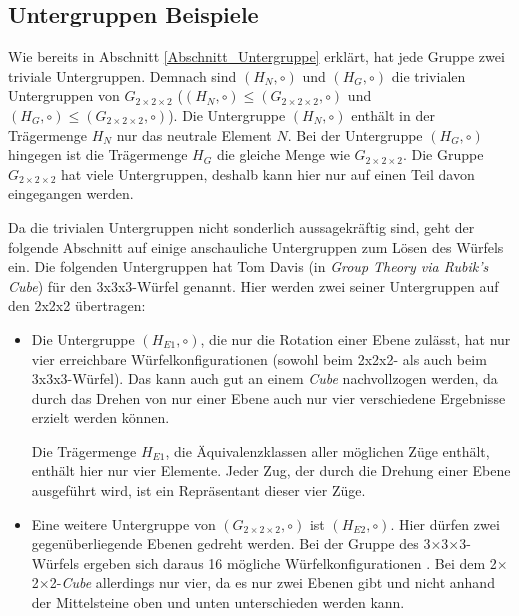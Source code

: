 \documentclass[12pt,a4paper, usenames, dvipsnames]{article}
\theoremstyle{mystyle}
\theoremstyle{definition}
\newcommand{\Gtwo}{\ensuremath{G_{2\times 2\times 2}}}
\newcommand{\Ttwo}{2$\times$2$\times$2-}
\newcommand{\Tthree}{3$\times$3$\times$3-}
\begin{document}
%
%
%
%
%
%
%
%
%
%
%
%
%
%
%
%
%
%
%
%
\subsection{Untergruppen Beispiele}



Wie bereits in Abschnitt \ref{Abschnitt_Untergruppe} erklärt, hat jede Gruppe zwei triviale Untergruppen. Demnach sind $(H_N, \circ)$ und $(H_G, \circ)$ die trivialen Untergruppen von $\Gtwo$ ($(H_N, \circ) \leqslant (\Gtwo, \circ)$ und $(H_G, \circ) \leqslant (\Gtwo, \circ)$). Die Untergruppe $(H_N, \circ)$ enthält in der Trägermenge $H_N$ nur das neutrale Element $N$. Bei der Untergruppe $(H_G, \circ)$ hingegen ist die Trägermenge $H_G$ die gleiche Menge wie $\Gtwo$.
Die Gruppe $\Gtwo$ hat viele Untergruppen, deshalb kann hier nur auf einen Teil davon eingegangen werden. 


Da die trivialen Untergruppen nicht sonderlich aussagekräftig sind, geht der folgende Abschnitt auf einige anschauliche Untergruppen zum Lösen des Würfels ein. Die folgenden Untergruppen hat Tom Davis (in  \textit{Group Theory via Rubik's Cube}) \cite{TD} für den 3x3x3-Würfel genannt. Hier werden zwei seiner Untergruppen auf den 2x2x2 übertragen: 
\begin{itemize}
\item Die Untergruppe $(H_{E1}, \circ)$, die nur die Rotation einer Ebene zulässt, hat nur vier erreichbare Würfelkonfigurationen (sowohl beim 2x2x2- als auch beim 3x3x3-Würfel). Das kann auch gut an einem \textit{Cube} nachvollzogen werden, da durch das Drehen von nur einer Ebene auch nur vier verschiedene Ergebnisse erzielt werden können.

Die Trägermenge $H_{E1}$, die Äquivalenzklassen aller möglichen Züge enthält, enthält hier nur vier Elemente. Jeder Zug, der durch die Drehung einer Ebene ausgeführt wird, ist ein Repräsentant dieser vier Züge.

\item Eine weitere Untergruppe von $(\Gtwo, \circ)$ ist $(H_{E2}, \circ)$. Hier dürfen zwei gegenüber\-liegende Ebenen gedreht werden. 
Bei der Gruppe des \Tthree Würfels ergeben sich daraus 16 mögliche Würfelkonfigurationen \cite{TD}. Bei dem \Ttwo \textit{Cube} allerdings nur vier, da es nur zwei Ebenen gibt und nicht anhand der Mittelsteine oben und unten unterschieden werden kann.
\end{itemize}
\end{document}
